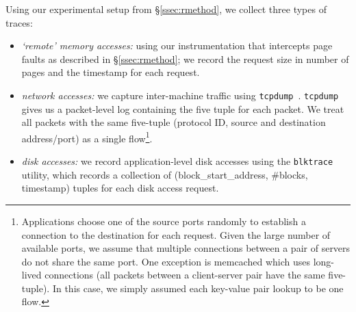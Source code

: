 Using our experimental setup from \S\ref{ssec:rmethod},%
we collect three types of traces: 
\begin{itemize}
\item \emph{`remote' memory accesses:} using our instrumentation that intercepts 
page faults as described in \S\ref{ssec:rmethod}; we record the 
request size in number of pages and the timestamp for each request.
\item \emph{network accesses:} we capture inter-machine traffic using {\tt tcpdump}~\cite{tcpdump}. {\tt tcpdump} gives us a packet-level log containing the five tuple for each packet. We treat all packets with the same five-tuple (protocol ID, source and destination address/port) as a single flow{\footnote{Applications choose one of the source ports randomly to establish a connection to the destination for each request. Given the large number of available ports, we assume that multiple connections between a pair of servers do not share the same port.  
One exception is memcached which uses long-lived connections (all packets between a client-server pair have the same five-tuple). In this case, we simply assumed each key-value pair lookup to be one flow.}}.
\item \emph{disk accesses:} we record application-level disk accesses using the {\tt blktrace} utility, which records a collection of (block\_start\_address, \#blocks, timestamp) tuples for each disk access request. 
\end{itemize} 


